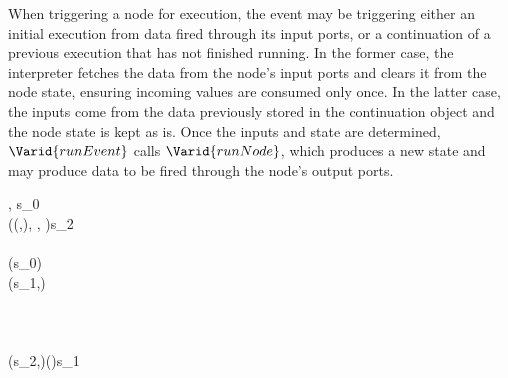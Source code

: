 When triggering a node for execution, the event may be triggering either an
initial execution from data fired through its input ports, or a continuation
of a previous execution that has not finished running. In the former case, the
interpreter fetches the data from the node's input ports and clears it from
the node state, ensuring incoming values are consumed only once. In the latter
case, the inputs come from the data previously stored in the continuation
object and the node state is kept as is. Once the inputs and state are
determined, \ensuremath{\Varid{runEvent}} calls \ensuremath{\Varid{runNode}}, which produces a new state and may
produce data to be fired through the node's output ports.

\begin{hscode}\SaveRestoreHook
{}%
%
%
%
%
%
%
%
%
%
%
\>[B]{}\;\llparenthesis {}, \rrparenthesis \;s_{0}\;\mathrel{=}{}\<[E]%
\\
\>[B]{}\<[4]%
\>[4]{}\;(\lambda {}\;(,)\to {}\;\;\;\llparenthesis {}, , \rrparenthesis \;)\;s_{2}\;\<[E]%
\\
\>[B]{}\<[4]%
\>[4]{}\<[E]%
\\
\>[4]{}\<[7]%
\>[7]{}\mathrel{=}\;(\;s_{0})\;\<[E]%
\\
\>[4]{}\<[7]%
\>[7]{}(s_{1},)\mathrel{=}{}\<[E]%
\\
\>[7]{}\<[10]%
\>[10]{}\;\;\;\<[E]%
\\
\>[7]{}\<[10]%
\>[10]{}\<[19]%
\>[19]{}\to {}\<[E]%
\\
\>[7]{}\<[10]%
\>[10]{}\;\<[19]%
\>[19]{}\to {}\;\<[E]%
\\
\>[4]{}\<[7]%
\>[7]{}(s_{2},)\mathrel{=}\;(\mathbin{\$}\;\mathbin{!!})\;s_{1}\;\;\<[E]%

\end{hscode}
